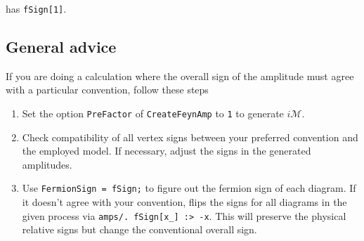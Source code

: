 \documentclass[../FeynCalcManual.tex]{subfiles}
\begin{document}
\begin{Shaded}
\begin{Highlighting}[]
\ExtensionTok{=}\OperatorTok{[}\OperatorTok{[}\OperatorTok{,}  \OtherTok{{-}\textgreater{}} \OperatorTok{],} \OperatorTok{\{}\OperatorTok{[}\OperatorTok{,} \OperatorTok{\{}\OperatorTok{\}],} \SpecialCharTok{{-}}\OperatorTok{[}\OperatorTok{,} \OperatorTok{\{}\OperatorTok{\}]\}} \OtherTok{{-}\textgreater{}} 
\OperatorTok{\{}\SpecialCharTok{{-}}\OperatorTok{[}\OperatorTok{,} \OperatorTok{\{}\OperatorTok{\}],} \OperatorTok{[}\OperatorTok{,} \OperatorTok{\{}\OperatorTok{\}]\},}\OtherTok{{-}\textgreater{}} \OperatorTok{\{}\OperatorTok{\},}\OtherTok{{-}\textgreater{}}\OperatorTok{]}\NormalTok{;}
\OperatorTok{[}\OperatorTok{,}\OtherTok{{-}\textgreater{}}\OperatorTok{]}
\end{Highlighting}
\end{Shaded}

has \texttt{fSign[\allowbreak{}1]}.

\hypertarget{general-advice}{%
\subsection{General advice}\label{general-advice}}

If you are doing a calculation where the overall sign of the amplitude
must agree with a particular convention, follow these steps

\begin{enumerate}
\def\labelenumi{\arabic{enumi}.}
\tightlist
\item
  Set the option \texttt{PreFactor} of \texttt{CreateFeynAmp} to
  \texttt{1} to generate \(i \mathcal{M}\).
\item
  Check compatibility of all vertex signs between your preferred
  convention and the employed model. If necessary, adjust the signs in
  the generated amplitudes.
\item
  Use \texttt{FermionSign = fSign;} to figure out the fermion sign of
  each diagram. If it doesn't agree with your convention, flips the
  signs for all diagrams in the given process via
  \texttt{amps/. fSign[\allowbreak{}x_] :> -x}. This will preserve the
  physical relative signs but change the conventional overall sign.
\end{enumerate}
\end{document}
